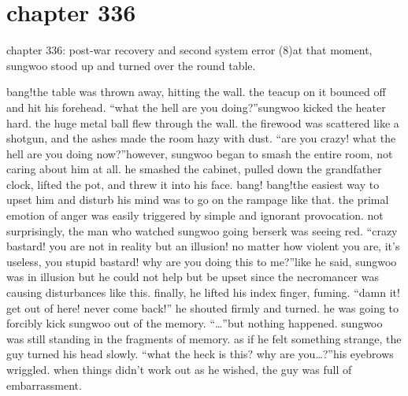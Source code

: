 \section{chapter 336}

chapter 336: post-war recovery and second system error (8)at that moment, sungwoo stood up and turned over the round table.





bang!the table was thrown away, hitting the wall.
 the teacup on it bounced off and hit his forehead.
“what the hell are you doing?”sungwoo kicked the heater hard.
 the huge metal ball flew through the wall.
 the firewood was scattered like a shotgun, and the ashes made the room hazy with dust.
“are you crazy! what the hell are you doing now?”however, sungwoo began to smash the entire room, not caring about him at all.
he smashed the cabinet, pulled down the grandfather clock, lifted the pot, and threw it into his face.
bang! bang!the easiest way to upset him and disturb his mind was to go on the rampage like that.
the primal emotion of anger was easily triggered by simple and ignorant provocation.
not surprisingly, the man who watched sungwoo going berserk was seeing red.
“crazy bastard! you are not in reality but an illusion! no matter how violent you are, it’s useless, you stupid bastard! why are you doing this to me?”like he said, sungwoo was in illusion but he could not help but be upset since the necromancer was causing disturbances like this.
 finally, he lifted his index finger, fuming.
“damn it! get out of here! never come back!” he shouted firmly and turned.
he was going to forcibly kick sungwoo out of the memory.
“…”but nothing happened.
 sungwoo was still standing in the fragments of memory.
as if he felt something strange, the guy turned his head slowly.
“what the heck is this? why are you…?”his eyebrows wriggled.
 when things didn’t work out as he wished, the guy was full of embarrassment.

